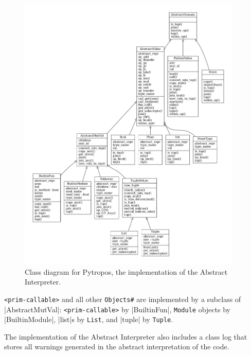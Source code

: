 \begin{figure}
\begin{center}
  \includegraphics[width=0.95\textwidth]{figures/classes_Pytropos-small.pdf}
\end{center}
\caption{Class diagram for Pytropos, the implementation of the Abstract
  Interpreter.\label{classPytropos}}
\end{figure}


\verb+<prim-callable>+ and all other
\texttt{Objects\#} are implemented by a subclass of
\pycode|AbstractMutVal|: \verb+<prim-callable>+
by \pycode|BuiltinFun|, \texttt{Module} objects by
\pycode|BuiltinModule|, \pycode|list|s by \texttt{List}, and
\pycode|tuple| by \texttt{Tuple}.

The implementation of the Abstract Interpreter also includes a class log that stores all
warnings generated in the abstract interpretation of the code.

